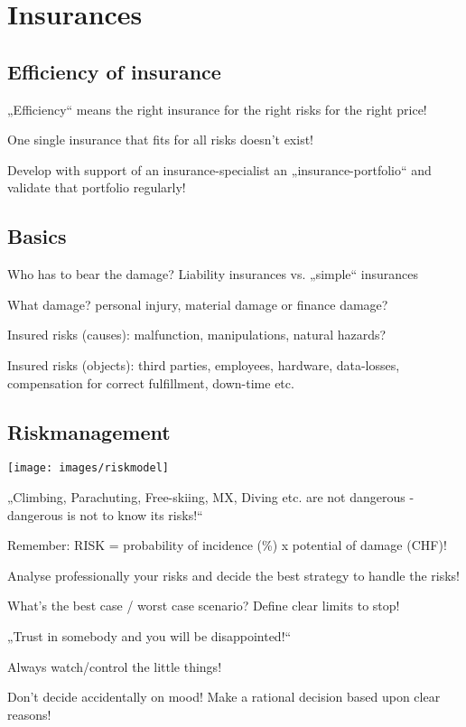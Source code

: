 \section{Insurances}
\subsection{Efficiency of insurance}
\begin{compactitem}
	\item „Efficiency“ means the right insurance for the right risks for the right price!
	\item One single insurance that fits for all risks doesn’t exist!
	\item Develop with support of an insurance-specialist an „insurance-portfolio“ and validate that portfolio regularly!
\end{compactitem}

\subsection{Basics}
\begin{compactitem}
	\item Who has to bear the damage? Liability insurances vs. „simple“	insurances
	\item What damage? personal injury, material damage or finance damage?
	\item Insured risks (causes): malfunction, manipulations, natural hazards?
	\item Insured risks (objects): third parties, employees, hardware, data-losses, compensation for correct fulfillment, down-time etc.
\end{compactitem}

\subsection{Riskmanagement}
\texttt{[image: images/riskmodel]}
\begin{compactitem}
	\item „Climbing, Parachuting, Free-skiing, MX, Diving etc. are not dangerous - dangerous is not to know its risks!“
	\item Remember: RISK = probability of incidence (\%) x potential of damage (CHF)!
	\item Analyse professionally your risks and decide the best strategy to handle the risks!
	\item What’s the best case / worst case scenario? Define clear limits to stop!
	\item „Trust in somebody and you will be disappointed!“
	\item Always watch/control the little things!
	\item Don’t decide accidentally on mood! Make a rational decision based upon clear reasons!
\end{compactitem}

